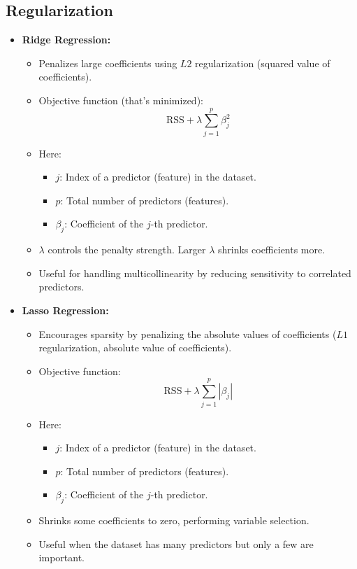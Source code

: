 \documentclass[11pt]{article}
\begin{document}
\subsection{Regularization}
\begin{itemize}
    \item \textbf{Ridge Regression:} 
    \begin{itemize}
        \item Penalizes large coefficients using $L2$ regularization (squared value of coefficients).
        \item Objective function (that's minimized):
        \[
        \text{RSS} + \lambda \sum_{j=1}^p \beta_j^2
        \]
        \item Here:
        \begin{itemize}
            \item $j$: Index of a predictor (feature) in the dataset.
            \item $p$: Total number of predictors (features).
            \item $\beta_j$: Coefficient of the $j$-th predictor.
        \end{itemize}
        \item $\lambda$ controls the penalty strength. Larger $\lambda$ shrinks coefficients more.
        \item Useful for handling multicollinearity by reducing sensitivity to correlated predictors.
    \end{itemize}
    
    \item \textbf{Lasso Regression:} 
    \begin{itemize}
        \item Encourages sparsity by penalizing the absolute values of coefficients ($L1$ regularization, absolute value of coefficients).
        \item Objective function:
        \[
        \text{RSS} + \lambda \sum_{j=1}^p |\beta_j|
        \]
        \item Here:
        \begin{itemize}
            \item $j$: Index of a predictor (feature) in the dataset.
            \item $p$: Total number of predictors (features).
            \item $\beta_j$: Coefficient of the $j$-th predictor.
        \end{itemize}
        \item Shrinks some coefficients to zero, performing variable selection.
        \item Useful when the dataset has many predictors but only a few are important.
    \end{itemize}
\end{itemize}
\end{document}
